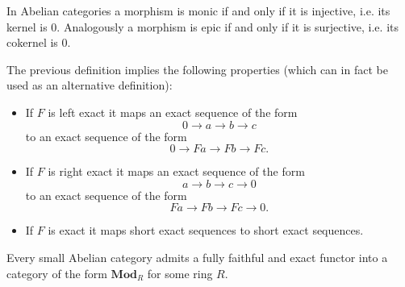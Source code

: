     \begin{property}
        In Abelian categories a morphism is monic if and only if it is injective, i.e. its kernel is 0. Analogously a morphism is epic if and only if it is surjective, i.e. its cokernel is 0.
    \end{property}


    \begin{result}
        The previous definition implies the following properties (which can in fact be used as an alternative definition):
        \begin{itemize}
            \item If $F$ is left exact it maps an exact sequence of the form \[0\longrightarrow a\longrightarrow b\longrightarrow c\]
            to an exact sequence of the form \[0\longrightarrow Fa\longrightarrow Fb\longrightarrow Fc.\]
            \item If $F$ is right exact it maps an exact sequence of the form \[a\longrightarrow b\longrightarrow c\longrightarrow 0\]
            to an exact sequence of the form \[Fa\longrightarrow Fb\longrightarrow Fc\longrightarrow 0.\]
            \item If $F$ is exact it maps short exact sequences to short exact sequences.
        \end{itemize}
    \end{result}

    \begin{theorem}
        Every small Abelian category admits a fully faithful and exact functor into a category of the form $\mathbf{Mod}_R$ for some ring $R$.
    \end{theorem}

